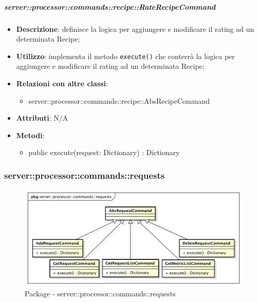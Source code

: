         \subparagraph{server::processor::commands::recipe::RateRecipeCommand} %
        \label{subp:bdsm_app_server_processor_commands_recipe_raterecipecommand}
        \begin{itemize}
          \item \textbf{Descrizione}: definisce la logica per aggiungere e modificare il rating ad un determinata Recipe;
          \item \textbf{Utilizzo}: implementa il metodo \texttt{execute()} che conterrà la logica per aggiungere e modificare il rating ad un determinata Recipe;
          \item \textbf{Relazioni con altre classi}:
            \begin{itemize}
              \item server::processor::commands::recipe::AbsRecipeCommand
            \end{itemize}
			\item \textbf{Attributi}: N/A
			\item \textbf{Metodi}:
        	\begin{itemize}
          		\item public execute(request: Dictionary) : Dictionary
        	\end{itemize}
        \end{itemize}


      \subsubsection{server::processor::commands::requests} %
      \label{ssub:bdsm_app_server_processor_commands_requests}
      \begin{figure}[!htbp]
      	\centering
      	\centerline{\includegraphics[scale=0.5]{./images/server/requests.pdf}}
      	\caption{Package - server::processor::commands::requests}
      \end{figure}

